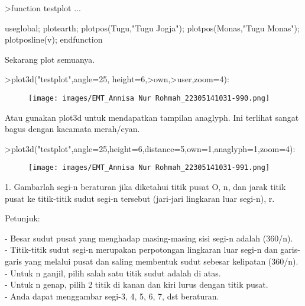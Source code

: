 \documentclass[a4paper,10pt]{article}
\begin{document}
\begin{eulernotebook}
\begin{eulercomment}
\begin{eulercomment}
\begin{eulercomment}
\begin{eulercomment}
\begin{eulerprompt}
>function testplot ...
\end{eulerprompt}
\begin{eulerudf}
  useglobal;
  plotearth;
  plotpos(Tugu,"Tugu Jogja"); plotpos(Monas,"Tugu Monas");
  plotposline(v);
  endfunction
\end{eulerudf}
\begin{eulercomment}
Sekarang plot semuanya.
\end{eulercomment}
\begin{eulerprompt}
>plot3d("testplot",angle=25, height=6,>own,>user,zoom=4):
\end{eulerprompt}
\begin{figure}[h]
    \centering
    \texttt{[image: images/EMT\_Annisa Nur Rohmah\_22305141031-990.png]}
\end{figure}
\begin{eulercomment}
Atau gunakan plot3d untuk mendapatkan tampilan anaglyph. Ini terlihat
sangat bagus dengan kacamata merah/cyan.
\end{eulercomment}
\begin{eulerprompt}
>plot3d("testplot",angle=25,height=6,distance=5,own=1,anaglyph=1,zoom=4):
\end{eulerprompt}
\begin{figure}[h]
    \centering
    \texttt{[image: images/EMT\_Annisa Nur Rohmah\_22305141031-991.png]}
\end{figure}
\begin{eulercomment}
1. Gambarlah segi-n beraturan jika diketahui titik pusat O, n, dan
jarak titik pusat ke titik-titik sudut segi-n tersebut (jari-jari
lingkaran luar segi-n), r.

Petunjuk:

- Besar sudut pusat yang menghadap masing-masing sisi segi-n adalah
(360/n).\\
- Titik-titik sudut segi-n merupakan perpotongan lingkaran luar segi-n
dan garis-garis yang melalui pusat dan saling membentuk sudut sebesar
kelipatan (360/n).\\
- Untuk n ganjil, pilih salah satu titik sudut adalah di atas.\\
- Untuk n genap, pilih 2 titik di kanan dan kiri lurus dengan titik
pusat.\\
- Anda dapat menggambar segi-3, 4, 5, 6, 7, dst beraturan.


\end{eulercomment}
\end{eulercomment}
\end{eulercomment}
\end{eulercomment}
\end{eulercomment}
\end{eulernotebook}
\end{document}
